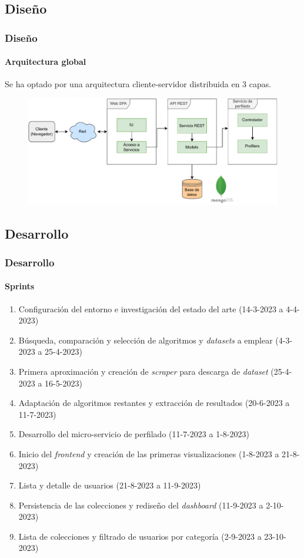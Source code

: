 \documentclass{beamer}
\begin{document}
\subsection{Diseño}

	\begin{frame}
		\frametitle{Diseño}
		\framesubtitle{Arquitectura global}
		Se ha optado por una arquitectura cliente-servidor distribuida en 3 capas.
		\begin{figure}[H]
			\centering
			\includegraphics[width=\textwidth]{arquitectura.pdf}
			  \label{fig:diagrama/arquitectura}
		\end{figure}
	\end{frame}

\subsection{Desarrollo}
	\begin{frame}
		\frametitle{Desarrollo}
		\framesubtitle{Sprints}

		\begin{enumerate}
			\item Configuración del entorno e investigación del estado del arte (14-3-2023 a 4-4-2023) \pause
			\item Búsqueda, comparación y selección de algoritmos y \textit{datasets} a emplear (4-3-2023 a 25-4-2023) \pause
			\item Primera aproximación y creación de \textit{scraper} para descarga de \textit{dataset} (25-4-2023 a 16-5-2023) \pause
			\item Adaptación de algoritmos restantes y extracción de resultados (20-6-2023 a 11-7-2023) \pause
			\item Desarrollo del micro-servicio de perfilado (11-7-2023 a 1-8-2023) \pause
			\item Inicio del \textit{frontend} y creación de las primeras visualizaciones (1-8-2023 a 21-8-2023) \pause
			\item Lista y detalle de usuarios (21-8-2023 a 11-9-2023) \pause
			\item Persistencia de las colecciones y rediseño del \textit{dashboard} (11-9-2023 a 2-10-2023) \pause
			\item Lista de colecciones y filtrado de usuarios por categoría (2-9-2023 a 23-10-2023) \pause
		\end{enumerate}
	\end{frame}
\end{document}
